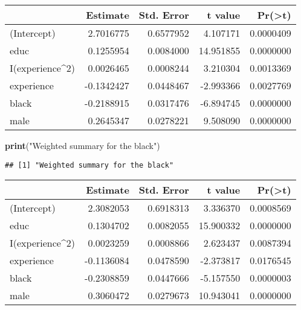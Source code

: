 \documentclass[
]{article}
\newenvironment{Shaded}{\begin{snugshade}}{\end{snugshade}}
\newcommand{\DataTypeTok}[1]{\textcolor[rgb]{0.13,0.29,0.53}{#1}}
\newcommand{\DecValTok}[1]{\textcolor[rgb]{0.00,0.00,0.81}{#1}}
\newcommand{\KeywordTok}[1]{\textcolor[rgb]{0.13,0.29,0.53}{\textbf{#1}}}
\newcommand{\NormalTok}[1]{#1}
\newcommand{\OperatorTok}[1]{\textcolor[rgb]{0.81,0.36,0.00}{\textbf{#1}}}
\newcommand{\StringTok}[1]{\textcolor[rgb]{0.31,0.60,0.02}{#1}}
\begin{document}
\begin{longtable}[]{@{}lrrrr@{}}
\toprule
& Estimate & Std. Error & t value &
Pr(\textgreater{}\textbar{}t\textbar{})\tabularnewline
\midrule
\endhead
(Intercept) & 2.7016775 & 0.6577952 & 4.107171 &
0.0000409\tabularnewline
educ & 0.1255954 & 0.0084000 & 14.951855 & 0.0000000\tabularnewline
I(experience\^{}2) & 0.0026465 & 0.0008244 & 3.210304 &
0.0013369\tabularnewline
experience & -0.1342427 & 0.0448467 & -2.993366 &
0.0027769\tabularnewline
black & -0.2188915 & 0.0317476 & -6.894745 & 0.0000000\tabularnewline
male & 0.2645347 & 0.0278221 & 9.508090 & 0.0000000\tabularnewline
\bottomrule
\end{longtable}

\begin{Shaded}
\begin{Highlighting}[]
\KeywordTok{print}\NormalTok{(}\StringTok{"Weighted summary for the black"}\NormalTok{)}
\end{Highlighting}
\end{Shaded}

\begin{verbatim}
## [1] "Weighted summary for the black"
\end{verbatim}

\begin{Shaded}
\end{Shaded}

\begin{longtable}[]{@{}lrrrr@{}}
\toprule
& Estimate & Std. Error & t value &
Pr(\textgreater{}\textbar{}t\textbar{})\tabularnewline
\midrule
\endhead
(Intercept) & 2.3082053 & 0.6918313 & 3.336370 &
0.0008569\tabularnewline
educ & 0.1304702 & 0.0082055 & 15.900332 & 0.0000000\tabularnewline
I(experience\^{}2) & 0.0023259 & 0.0008866 & 2.623437 &
0.0087394\tabularnewline
experience & -0.1136084 & 0.0478590 & -2.373817 &
0.0176545\tabularnewline
black & -0.2308859 & 0.0447666 & -5.157550 & 0.0000003\tabularnewline
male & 0.3060472 & 0.0279673 & 10.943041 & 0.0000000\tabularnewline
\bottomrule
\end{longtable}
\end{document}
